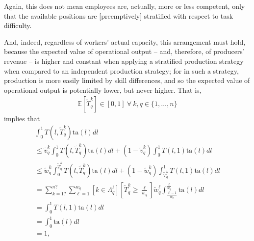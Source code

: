 \documentclass[hidelinks, nonatbib]{elsarticle}
\begin{document}
        Again, this does not mean employees are, actually, more or less competent, only that the available positions are [preemptively] stratified with respect to task difficulty. 

        And, indeed, regardless of workers' actual capacity, this arrangement must hold, because the expected value of operational output -- and, therefore, of producers' revenue -- is higher and constant when applying a stratified production strategy when compared to an independent production strategy; for in such a strategy, production is more easily limited by skill differences, and so the expected value of operational output is potentially lower, but never higher. That is, 
        \begin{gather}
            \mathbb{E}[
                \tilde{T}_{q}^{k}
            ]
            \in [0,1]
            \
            \forall
            \
            k,q \in \{1, \dots, n\}
        \end{gather}
        implies that
        \begin{align}
            \int_{0}^{1}{
                T(l,\tilde{T}_{q}^{k})
                \text{ta}(l)
                dl
            } 
            \\
            \leq
            \tilde{v}_{q}^{k}
            \int_{0}^{1}{
                T(l,\tilde{T}_{q}^{k})
                \text{ta}(l)
                dl
            }
            +
            (1 - \tilde{v}_{q}^{k})
            \int_{0}^{1}{
                T(l,1)
                \text{ta}(l)
                dl
            } 
            \\
            \leq
            \tilde{w}_{q}^{k}
            \int_{0}^{\tilde{T}_{q}^{k}}{
                T(l,\tilde{T}_{q}^{k})
                \text{ta}(l)
                dl
            } + 
            (1 - \tilde{w}_{q}^{k})
            \int_{\tilde{T}_{q}^{k}}^{1}{
                T(l,1)
                \text{ta}(l)
                dl
            }
            \\
            =
            \sum_{k=1?}^{n?}
            \sum_{\ell=1}^{w_q}
            \left[
                k \in \Lambda_{q}^{\ell}
            \right]
            \left[
                \tilde{T}_{q}^{k}
                \geq 
                \frac{\ell}{w_q}
            \right]
            \tilde{w}_{q}^{\ell}
            \int_{
                \frac{\ell - 1}{w_q}
            }^{
                \frac{\ell}{w_q}
            }{
                \text{ta}(l)
                dl
            }
            \\
            =
            \int_{0}^{1}{
                T(l,1)
                \text{ta}(l)
                dl
            }
            \\
            =
            \int_{0}^{1}{
                \text{ta}(l)
                dl
            }
            \\
            =
            1
            ,
        \end{align}
\end{document}
